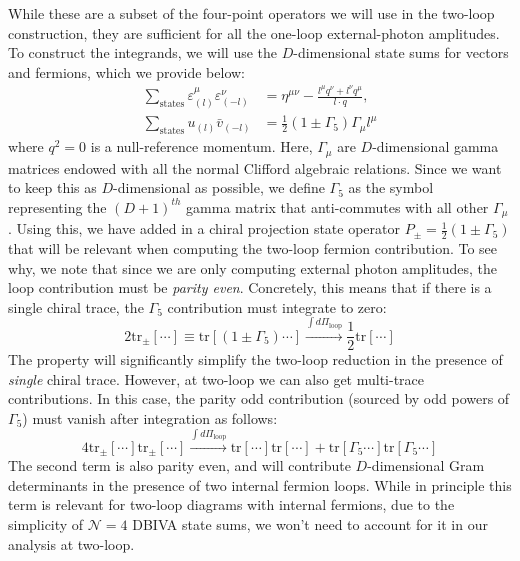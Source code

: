 \documentclass[12pt,letter]{article}
\def\be{\begin{equation}}
\def\ee{\end{equation}}
\begin{document}
While these are a subset of the four-point operators we will use in the two-loop construction, they are sufficient for all the one-loop external-photon amplitudes. To construct the integrands, we will use the $D$-dimensional state sums for vectors and fermions, which we provide below:
\begin{align}
\sum_{\text{states}}\varepsilon^\mu_{(l)}\varepsilon^\nu_{(-l)} &= \eta^{\mu\nu} - \frac{l^\mu q^\nu+l^\nu q^\mu}{l\cdot q},
\\
\sum_{\text{states}}u_{(l)}\bar{v}_{(-l)} &= \frac{1}{2}(1\pm \Gamma_5)\Gamma_\mu l^\mu 
\end{align}
where $q^2=0$ is a null-reference momentum. Here, $\Gamma_\mu$ are $D$-dimensional gamma matrices endowed with all the normal Clifford algebraic relations. Since we want to keep this as $D$-dimensional as possible, we define $\Gamma_5$ as the symbol representing the $(D+1)^{th}$ gamma matrix that anti-commutes with all other $\Gamma_\mu$. Using this, we have added in a chiral projection state operator $P_{\pm}=\frac{1}{2}(1\pm \Gamma_5)$ that will be relevant when computing the two-loop fermion contribution. To see why, we note that since we are only computing external photon amplitudes, the loop contribution must be \textit{parity even}. Concretely, this means that if there is a single chiral trace, the $\Gamma_5$ contribution must integrate to zero:
\be
2\text{tr}_{\pm}[\cdots] \equiv \text{tr}[(1\pm \Gamma_5)\cdots]  \xrightarrow{\int d\Pi_{\text{loop}}} \frac{1}{2}\text{tr}[\cdots]
\ee
The property will significantly simplify the two-loop reduction in the presence of \textit{single} chiral trace. However, at two-loop we can also get multi-trace contributions. In this case, the parity odd contribution (sourced by odd powers of $\Gamma_5$) must vanish after integration as follows:
\be
4\text{tr}_{\pm}[\cdots] \text{tr}_{\pm}[\cdots]  \xrightarrow{\int d\Pi_{\text{loop}}} \text{tr}[\cdots]\text{tr}[\cdots]+\text{tr}[\Gamma_5\cdots]\text{tr}[\Gamma_5\cdots]
\ee
The second term is also parity even, and will contribute $D$-dimensional Gram determinants in the presence of two internal fermion loops. While in principle this term is relevant for two-loop diagrams with internal fermions, due to the simplicity of $\mathcal{N}=4$ DBIVA state sums, we won't need to account for it in our analysis at two-loop. 
\end{document}
